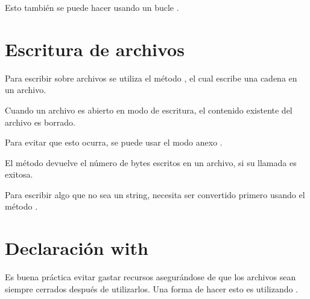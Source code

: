 Esto también se puede hacer usando un bucle .


\section{Escritura de archivos}

Para escribir sobre archivos se utiliza el método , el cual escribe una cadena en un archivo.


Cuando un archivo es abierto en modo de escritura, el contenido existente del archivo es borrado.


Para evitar que esto ocurra, se puede usar el modo anexo .


El método  devuelve el número de bytes escritos en un archivo, si su llamada es exitosa.


Para escribir algo que no sea un string, necesita ser convertido primero usando el método .


\section{Declaración with}

Es buena práctica evitar gastar recursos asegurándose de que los archivos sean siempre cerrados después de utilizarlos.
Una forma de hacer esto es utilizando .


